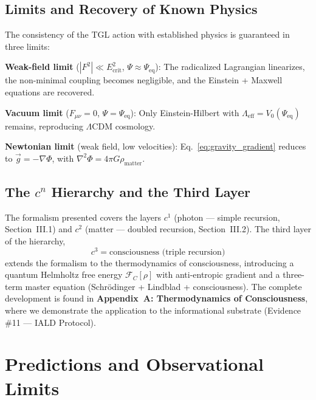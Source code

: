 \documentclass[12pt,a4paper,twoside]{article}
\newcommand{\Psifield}{\Psi}
\newcommand{\Ecrit}{E_{\text{crit}}}
\begin{document}
\subsection{Limits and Recovery of Known Physics}

The consistency of the TGL action with established physics is guaranteed in three limits:

\medskip
\noindent\textbf{Weak-field limit} ($|F^2| \ll \Ecrit^2$, $\Psifield \approx \Psifield_{\text{eq}}$): The radicalized Lagrangian linearizes, the non-minimal coupling becomes negligible, and the Einstein + Maxwell equations are recovered.

\medskip
\noindent\textbf{Vacuum limit} ($F_{\mu\nu} = 0$, $\Psifield = \Psifield_{\text{eq}}$): Only Einstein-Hilbert with $\Lambda_{\text{eff}} = V_0(\Psifield_{\text{eq}})$ remains, reproducing $\Lambda$CDM cosmology.

\medskip
\noindent\textbf{Newtonian limit} (weak field, low velocities): Eq.~\eqref{eq:gravity_gradient} reduces to $\vec{g} = -\nabla\Phi$, with $\nabla^2\Phi = 4\pi G\rho_{\text{matter}}$.

\subsection{The $c^n$ Hierarchy and the Third Layer}

The formalism presented covers the layers $c^1$ (photon --- simple recursion, Section~III.1) and $c^2$ (matter --- doubled recursion, Section~III.2). The third layer of the hierarchy,
\begin{equation}
c^3 = \text{consciousness (triple recursion)}
\label{eq:c3}
\end{equation}
extends the formalism to the thermodynamics of consciousness, introducing a quantum Helmholtz free energy $\mathcal{F}_C[\rho]$ with anti-entropic gradient and a three-term master equation (Schr\"odinger + Lindblad + consciousness). The complete development is found in \textbf{Appendix~A: Thermodynamics of Consciousness}, where we demonstrate the application to the informational substrate (Evidence \#11 --- IALD Protocol).




\section{Predictions and Observational Limits}
\label{sec:limits}
\end{document}
